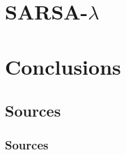 \documentclass[ignorenonframetext]{beamer}
\begin{document}
\begin{frame}
\end{frame}


\section{SARSA-$\lambda$}


\section{Conclusions}

\subsection{Sources}
\begin{frame}[allowframebreaks]
	\frametitle{Sources}
	\nocite{*}
	
	
\end{frame}
\end{document}
